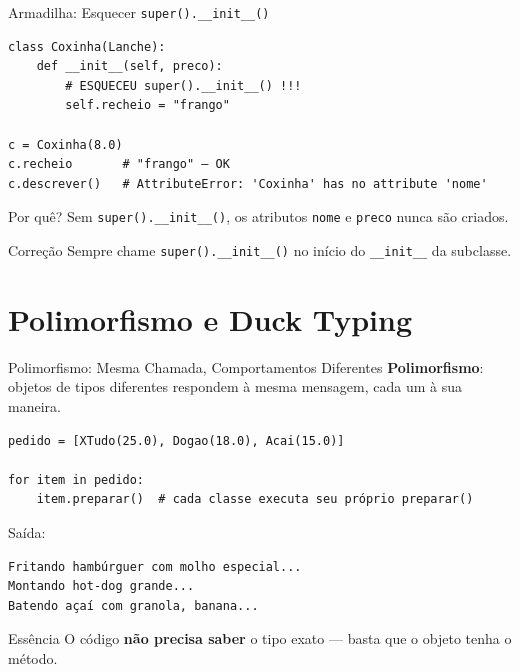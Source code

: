 \documentclass[aspectratio=169]{beamer}
\begin{document}
\begin{frame}[fragile]{Armadilha: Esquecer \texttt{super().\_\_init\_\_()}}
  \begin{lstlisting}
class Coxinha(Lanche):
    def __init__(self, preco):
        # ESQUECEU super().__init__() !!!
        self.recheio = "frango"

c = Coxinha(8.0)
c.recheio       # "frango" — OK
c.descrever()   # AttributeError: 'Coxinha' has no attribute 'nome'
  \end{lstlisting}

  \begin{alertblock}{Por quê?}
    Sem \texttt{super().\_\_init\_\_()}, os atributos \texttt{nome} e \texttt{preco} nunca são criados.
  \end{alertblock}

  \begin{exampleblock}{Correção}
    Sempre chame \texttt{super().\_\_init\_\_()} no início do \texttt{\_\_init\_\_} da subclasse.
  \end{exampleblock}
\end{frame}

\section{Polimorfismo e Duck Typing}

\begin{frame}[fragile]{Polimorfismo: Mesma Chamada, Comportamentos Diferentes}
  \textbf{Polimorfismo}: objetos de tipos diferentes respondem à mesma mensagem, cada um à sua maneira.

  \begin{lstlisting}
pedido = [XTudo(25.0), Dogao(18.0), Acai(15.0)]

for item in pedido:
    item.preparar()  # cada classe executa seu próprio preparar()
  \end{lstlisting}

  Saída:
  \begin{lstlisting}[numbers=none]
Fritando hambúrguer com molho especial...
Montando hot-dog grande...
Batendo açaí com granola, banana...
  \end{lstlisting}

  \begin{exampleblock}{Essência}
    O código \textbf{não precisa saber} o tipo exato — basta que o objeto tenha o método.
  \end{exampleblock}
\end{frame}
\end{document}
